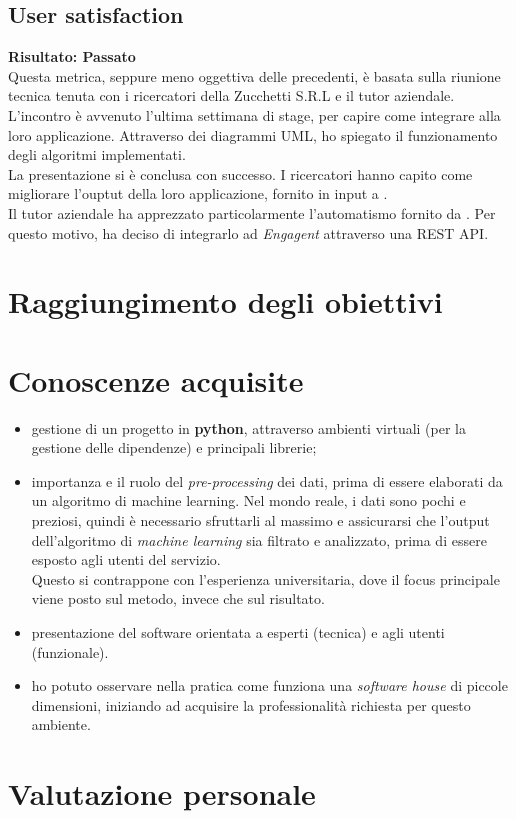 \subsection{User satisfaction} %
\textbf{Risultato: Passato}\\
Questa metrica, seppure meno oggettiva delle precedenti, è basata sulla riunione tecnica tenuta con i ricercatori della Zucchetti S.R.L e il tutor aziendale.\\
L'incontro è avvenuto l'ultima settimana di stage, per capire come integrare {\app} alla loro applicazione. Attraverso dei diagrammi UML, ho spiegato il funzionamento degli algoritmi implementati.\\
La presentazione si è conclusa con successo. I ricercatori hanno capito come migliorare l'ouptut della loro applicazione, fornito in input a {\app}.\\
Il tutor aziendale ha apprezzato particolarmente l'automatismo fornito da {\app}. Per questo motivo, ha deciso di integrarlo ad \textit{Engagent} attraverso una REST API.

\section{Raggiungimento degli obiettivi}

\section{Conoscenze acquisite}
\begin{itemize}
    \item gestione di un progetto in \textbf{python}, attraverso ambienti virtuali (per la gestione delle dipendenze) e principali librerie;
    \item importanza e il ruolo del \textit{pre-processing} dei dati, prima di essere elaborati da un algoritmo di machine learning. Nel mondo reale, i dati sono pochi e preziosi, quindi è necessario sfruttarli al massimo e assicurarsi che l'output dell'algoritmo di \textit{machine learning} sia filtrato e analizzato, prima di essere esposto agli utenti del servizio.\\ Questo si contrappone con l'esperienza universitaria, dove il focus principale viene posto sul metodo, invece che sul risultato.
    \item presentazione del software orientata a esperti (tecnica) e agli utenti (funzionale).
    \item ho potuto osservare nella pratica come funziona una \textit{software house} di piccole dimensioni, iniziando ad acquisire la professionalità richiesta per questo ambiente.
\end{itemize}
\section{Valutazione personale}
